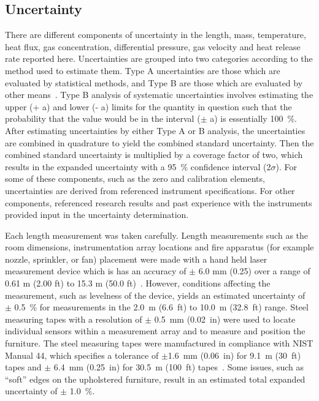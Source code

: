 \documentclass[12pt,oneside]{book}
\begin{document}
\subsection{Uncertainty}
\label{subsec:Uncertainty}

There are different components of uncertainty in the length, mass, temperature, heat flux, gas concentration, differential pressure, gas velocity and heat release rate reported here. Uncertainties are grouped into two categories according to the method used to estimate them. Type A uncertainties are those which are evaluated by statistical methods, and Type B are those which are evaluated by other means~\cite{Taylor&Kuyatt:1994}. Type B analysis of systematic uncertainties involves estimating the upper (+ a) and lower (- a) limits for the quantity in question such that the probability that the value would be in the interval ($\pm$ a) is essentially 100~\%. After estimating uncertainties by either Type A or B analysis, the uncertainties are combined in quadrature to yield the combined standard uncertainty. Then the combined standard uncertainty is multiplied by a coverage factor of two, which results in the expanded uncertainty with a 95~\% confidence interval (2$\sigma$).  For some of these components, such as the zero and calibration elements, uncertainties are derived from referenced instrument specifications. For other components, referenced research results and past experience with the instruments provided input in the uncertainty determination.

Each length measurement was taken carefully. Length measurements such as the room dimensions, instrumentation array locations and fire apparatus (for example nozzle, sprinkler, or fan) placement were made with a hand held laser measurement device which is has an accuracy of $\pm$ 6.0 mm (0.25) over a range of 0.61 m (2.00 ft) to 15.3 m (50.0 ft)~\cite{StanleyTools}.  However, conditions affecting the measurement, such as levelness of the device, yields an estimated uncertainty of $\pm$ 0.5~\% for measurements in the 2.0~m (6.6~ft) to 10.0~m (32.8~ft) range.  Steel measuring tapes with a resolution of  $\pm$ 0.5~mm (0.02~in) were used to locate individual sensors within a measurement array and to measure and position the furniture. The steel measuring tapes were manufactured in compliance with NIST Manual 44, which specifies a tolerance of $\pm$1.6~mm (0.06~in) for 9.1~m (30~ft) tapes and $\pm$ 6.4~mm (0.25~in) for 30.5~m (100~ft) tapes~\cite{Butcher:2012}. Some issues, such as ``soft'' edges on the upholstered furniture, result in an estimated total expanded uncertainty of $\pm$ 1.0~\%.
\end{document}
